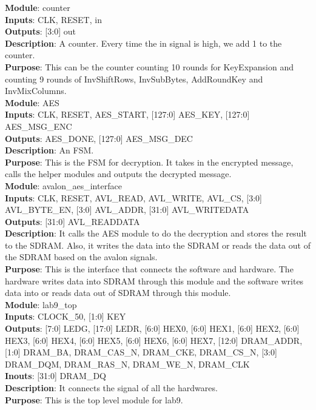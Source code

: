 \documentclass[12pt]{article}
\begin{document}
\textbf{Module}: counter \\ 
\textbf{Inputs}: CLK, RESET, in \\ 
\textbf{Outputs}: [3:0] out \\
\textbf{Description}: A counter. Every time the in signal is high, we add 1 to the counter. \\ 
\textbf{Purpose}: This can be the counter counting 10 rounds for KeyExpansion and counting 9 rounds of InvShiftRows, InvSubBytes, AddRoundKey and InvMixColumns. \\

\textbf{Module}: AES \\ 
\textbf{Inputs}: CLK, RESET, AES\_START, [127:0] AES\_KEY, [127:0] AES\_MSG\_ENC \\ 
\textbf{Outputs}: AES\_DONE, [127:0] AES\_MSG\_DEC \\
\textbf{Description}: An FSM. \\ 
\textbf{Purpose}: This is the FSM for decryption. It takes in the encrypted message, calls the helper modules and outputs the decrypted message. \\

\textbf{Module}: avalon\_aes\_interface \\ 
\textbf{Inputs}: CLK, RESET, AVL\_READ, AVL\_WRITE, AVL\_CS, [3:0] AVL\_BYTE\_EN, [3:0] AVL\_ADDR, [31:0] AVL\_WRITEDATA \\ 
\textbf{Outputs}: [31:0] AVL\_READDATA \\
\textbf{Description}: It calls the AES module to do the decryption and stores the result to the SDRAM. Also, it writes the data into the SDRAM or reads the data out of the SDRAM based on the avalon signals. \\ 
\textbf{Purpose}: This is the interface that connects the software and hardware. The hardware writes data into SDRAM through this module and the software writes data into or reads data out of SDRAM through this module. \\

\textbf{Module}: lab9\_top \\ 
\textbf{Inputs}: CLOCK\_50, [1:0] KEY \\ 
\textbf{Outputs}: [7:0] LEDG, [17:0] LEDR, [6:0] HEX0, [6:0] HEX1, [6:0] HEX2, [6:0] HEX3, [6:0] HEX4, [6:0] HEX5, [6:0] HEX6, [6:0] HEX7, [12:0] DRAM\_ADDR, [1:0] DRAM\_BA, DRAM\_CAS\_N, DRAM\_CKE, DRAM\_CS\_N, [3:0] DRAM\_DQM, DRAM\_RAS\_N, DRAM\_WE\_N, DRAM\_CLK \\
\textbf{Inouts}: [31:0] DRAM\_DQ \\
\textbf{Description}: It connects the signal of all the hardwares. \\ 
\textbf{Purpose}: This is the top level module for lab9. \\
\end{document}
